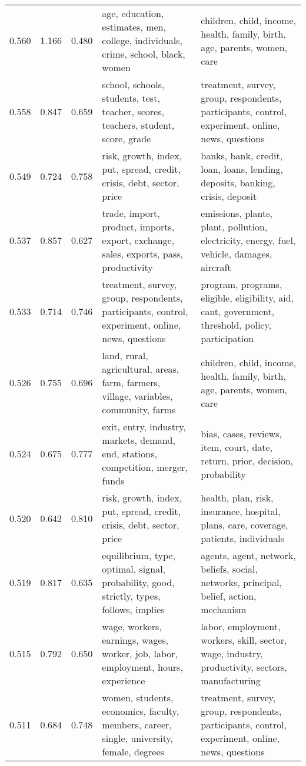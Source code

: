\begin{tabular}{cccp{5cm}p{5cm}}
0.560 & 1.166 & 0.480 & age, education, estimates, men, college, individuals, crime, school, black, women & children, child, income, health, family, birth, age, parents, women, care \\
0.558 & 0.847 & 0.659 & school, schools, students, test, teacher, scores, teachers, student, score, grade & treatment, survey, group, respondents, participants, control, experiment, online, news, questions \\
0.549 & 0.724 & 0.758 & risk, growth, index, put, spread, credit, crisis, debt, sector, price & banks, bank, credit, loan, loans, lending, deposits, banking, crisis, deposit \\
0.537 & 0.857 & 0.627 & trade, import, product, imports, export, exchange, sales, exports, pass, productivity & emissions, plants, plant, pollution, electricity, energy, fuel, vehicle, damages, aircraft \\
0.533 & 0.714 & 0.746 & treatment, survey, group, respondents, participants, control, experiment, online, news, questions & program, programs, eligible, eligibility, aid, cant, government, threshold, policy, participation \\
0.526 & 0.755 & 0.696 & land, rural, agricultural, areas, farm, farmers, village, variables, community, farms & children, child, income, health, family, birth, age, parents, women, care \\
0.524 & 0.675 & 0.777 & exit, entry, industry, markets, demand, end, stations, competition, merger, funds & bias, cases, reviews, item, court, date, return, prior, decision, probability \\
0.520 & 0.642 & 0.810 & risk, growth, index, put, spread, credit, crisis, debt, sector, price & health, plan, risk, insurance, hospital, plans, care, coverage, patients, individuals \\
0.519 & 0.817 & 0.635 & equilibrium, type, optimal, signal, probability, good, strictly, types, follows, implies & agents, agent, network, beliefs, social, networks, principal, belief, action, mechanism \\
0.515 & 0.792 & 0.650 & wage, workers, earnings, wages, worker, job, labor, employment, hours, experience & labor, employment, workers, skill, sector, wage, industry, productivity, sectors, manufacturing \\
0.511 & 0.684 & 0.748 & women, students, economics, faculty, members, career, single, university, female, degrees & treatment, survey, group, respondents, participants, control, experiment, online, news, questions \\

\end{tabular}
